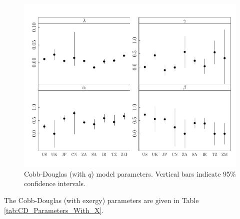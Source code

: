\documentclass[preprint,authoryear,12pt]{elsarticle}\usepackage{graphicx, color}
\makeatletter
\def\maxwidth{ %
  \ifdim\Gin@nat@width>\linewidth
    \linewidth
  \else
    \Gin@nat@width
  \fi
}
\newenvironment{knitrout}{}{} %
\makeatother
\begin{document}
\begin{knitrout}
\begin{figure}[]
\includegraphics[width=\maxwidth]{figure/CDq_Params_Graph} \caption[Cobb-Douglas (with $q$) model parameters]{Cobb-Douglas (with $q$) model parameters. Vertical bars indicate 95\% confidence intervals.\label{fig:CDq_Params_Graph}}
\end{figure}


\end{knitrout}


The Cobb-Douglas (with exergy) parameters are given in Table \ref{tab:CD_Parameters_With_X}.
\end{document}
